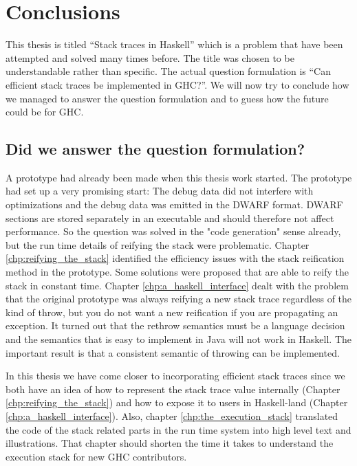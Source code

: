 \chapter{Conclusions}

This thesis is titled ``Stack traces in Haskell'' which is a problem
that have been attempted and solved many times before. The title was
chosen to be understandable rather than specific. The actual question
formulation is ``Can efficient stack traces be implemented in GHC?''.
We will now try to conclude how we managed to answer the question
formulation and to guess how the future could be for GHC.

\section{Did we answer the question formulation?}

A prototype had already been made when this thesis work started. The
prototype had set up a very promising start: The debug data did not
interfere with optimizations and the debug data was emitted in the DWARF
format. DWARF sections are stored separately in an executable and should
therefore not affect performance. So the question was solved in the
"code generation" sense already, but the run time details of reifying
the stack were problematic. Chapter \ref{chp:reifying_the_stack}
identified the efficiency issues with the stack reification method in
the prototype. Some solutions were proposed that are able to reify the
stack in constant time. Chapter \ref{chp:a_haskell_interface} dealt
with the problem that the original prototype was always reifying a new
stack trace regardless of the kind of throw, but you do not want a new
reification if you are propagating an exception. It turned out that the
rethrow semantics must be a language decision and the semantics that is
easy to implement in Java will not work in Haskell. The important
result is that a consistent semantic of throwing can be implemented.

In this thesis we have come closer to incorporating
efficient stack traces since we both have an idea of how
to represent the stack trace value internally (Chapter
\ref{chp:reifying_the_stack}) and how to expose it to users in
Haskell-land (Chapter \ref{chp:a_haskell_interface}). Also, chapter
\ref{chp:the_execution_stack} translated the code of the stack related
parts in the run time system into high level text and illustrations.
That chapter should shorten the time it takes to understand the
execution stack for new GHC contributors.

